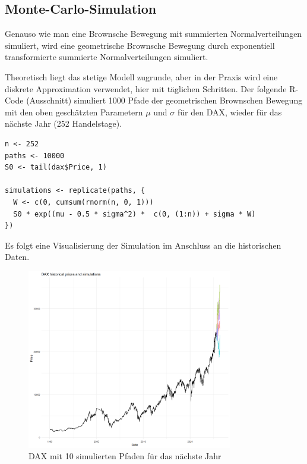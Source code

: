 \subsection{Monte-Carlo-Simulation}

Genauso wie man eine Brownsche Bewegung mit summierten Normalverteilungen simuliert, 
wird eine geometrische Brownsche Bewegung durch exponentiell transformierte
summierte Normalverteilungen simuliert. 


\begin{bsp}
Theoretisch liegt das stetige Modell zugrunde, 
aber in der Praxis wird eine diskrete Approximation verwendet, hier mit täglichen Schritten.
Der folgende R-Code (Ausschnitt) simuliert 1000 Pfade der geometrischen Brownschen Bewegung
mit den oben geschätzten Parametern $\mu$ und $\sigma$ für den DAX, wieder für das nächste Jahr (252 Handelstage).

\begin{lstlisting}
n <- 252
paths <- 10000
S0 <- tail(dax$Price, 1)

simulations <- replicate(paths, {
  W <- c(0, cumsum(rnorm(n, 0, 1)))
  S0 * exp((mu - 0.5 * sigma^2) *  c(0, (1:n)) + sigma * W)
})
\end{lstlisting}
Es folgt eine Visualisierung der Simulation im Anschluss an die historischen Daten.

\begin{figure}[H]
    \centering
    \includegraphics[width=0.8\textwidth]{images/dax_monte_carlo.png}
    \caption{DAX mit 10 simulierten Pfaden für das nächste Jahr}
    \label{fig:dax_monte_carlo}
\end{figure}

\end{bsp}

